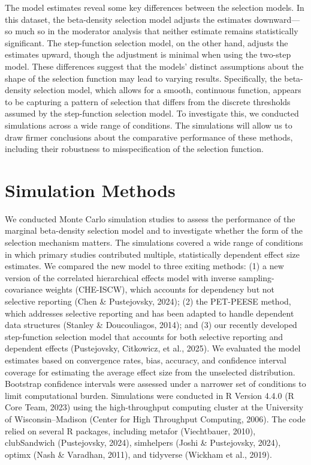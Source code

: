 \documentclass[
  man, donotrepeattitle,floatsintext]{apa7}
\begin{document}
The model estimates reveal some key differences between the selection models. In this dataset, the beta-density selection model adjusts the estimates downward---so much so in the moderator analysis that neither estimate remains statistically significant. The step-function selection model, on the other hand, adjusts the estimates upward, though the adjustment is minimal when using the two-step model.
These differences suggest that the models' distinct assumptions about the shape of the selection function may lead to varying results. Specifically, the beta-density selection model, which allows for a smooth, continuous function, appears to be capturing a pattern of selection that differs from the discrete thresholds assumed by the step-function selection model.
To investigate this, we conducted simulations across a wide range of conditions. The simulations will allow us to draw firmer conclusions about the comparative performance of these methods, including their robustness to misspecification of the selection function.

\section{Simulation Methods}\label{simulation-methods}

We conducted Monte Carlo simulation studies to assess the performance of the marginal beta-density selection model and to investigate whether the form of the selection mechanism matters.
The simulations covered a wide range of conditions in which primary studies contributed multiple, statistically dependent effect size estimates.
We compared the new model to three exiting methods: (1) a new version of the correlated hierarchical effects model with inverse sampling-covariance weights (CHE-ISCW), which accounts for dependency but not selective reporting (Chen \& Pustejovsky, 2024); (2) the PET-PEESE method, which addresses selective reporting and has been adapted to handle dependent data structures (Stanley \& Doucouliagos, 2014); and (3) our recently developed step-function selection model that accounts for both selective reporting and dependent effects (Pustejovsky, Citkowicz, et al., 2025).
We evaluated the model estimates based on convergence rates, bias, accuracy, and confidence interval coverage for estimating the average effect size from the unselected distribution. Bootstrap confidence intervals were assessed under a narrower set of conditions to limit computational burden.
Simulations were conducted in R Version 4.4.0 (R Core Team, 2023) using the high-throughput computing cluster at the University of Wisconsin--Madison (Center for High Throughput Computing, 2006).
The code relied on several R packages, including metafor (Viechtbauer, 2010), clubSandwich (Pustejovsky, 2024), simhelpers (Joshi \& Pustejovsky, 2024), optimx (Nash \& Varadhan, 2011), and tidyverse (Wickham et al., 2019).
\end{document}
